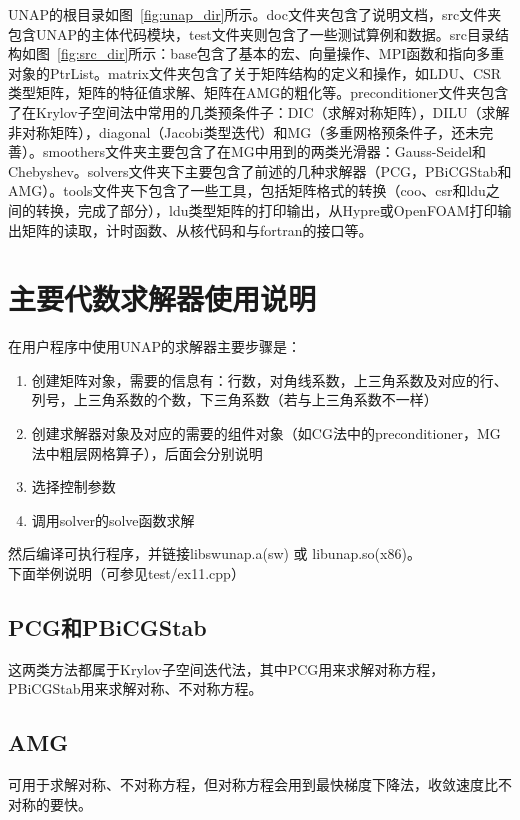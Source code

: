 \documentclass{ctexart}
\begin{document}
UNAP的根目录如图~\ref{fig:unap_dir}所示。doc文件夹包含了说明文档，src文件夹包含UNAP的主体代码模块，test文件夹则包含了一些测试算例和数据。src目录结构如图~\ref{fig:src_dir}所示：base包含了基本的宏、向量操作、MPI函数和指向多重对象的PtrList。matrix文件夹包含了关于矩阵结构的定义和操作，如LDU、CSR类型矩阵，矩阵的特征值求解、矩阵在AMG的粗化等。preconditioner文件夹包含了在Krylov子空间法中常用的几类预条件子：DIC（求解对称矩阵），DILU（求解非对称矩阵），diagonal（Jacobi类型迭代）和MG（多重网格预条件子，还未完善）。smoothers文件夹主要包含了在MG中用到的两类光滑器：Gauss-Seidel和Chebyshev。solvers文件夹下主要包含了前述的几种求解器（PCG，PBiCGStab和AMG）。tools文件夹下包含了一些工具，包括矩阵格式的转换（coo、csr和ldu之间的转换，完成了部分），ldu类型矩阵的打印输出，从Hypre或OpenFOAM打印输出矩阵的读取，计时函数、从核代码和与fortran的接口等。


\section{主要代数求解器使用说明}
在用户程序中使用UNAP的求解器主要步骤是：

\begin{enumerate}[label=\arabic*)]
\item 创建矩阵对象，需要的信息有：行数，对角线系数，上三角系数及对应的行、列号，上三角系数的个数，下三角系数（若与上三角系数不一样）
\item 创建求解器对象及对应的需要的组件对象（如CG法中的preconditioner，MG法中粗层网格算子），后面会分别说明
\item 选择控制参数
\item 调用solver的solve函数求解
\end{enumerate}

然后编译可执行程序，并链接libswunap.a(sw) 或 libunap.so(x86)。\\
下面举例说明（可参见test/ex11.cpp）

\subsection{PCG和PBiCGStab}
这两类方法都属于Krylov子空间迭代法，其中PCG用来求解对称方程，PBiCGStab用来求解对称、不对称方程。
\vspace{5mm}

\vspace{3mm}

\subsection{AMG}
可用于求解对称、不对称方程，但对称方程会用到最快梯度下降法，收敛速度比不对称的要快。
\vspace{5mm}

\vspace{3mm}
\end{document}
